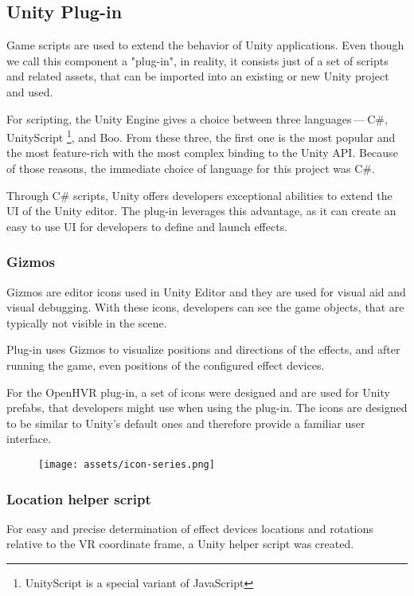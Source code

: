 \hypertarget{x-unity-plug-in}{\subsection*{Unity Plug-in}}
Game scripts are used to extend the behavior of Unity applications. Even though
we call this component a "plug-in", in reality, it consists just of a
set of scripts and related assets, that can be imported into an existing
or new Unity project and used.


For scripting, the Unity Engine gives a choice between three languages — C\#, UnityScript \footnote{UnityScript is a special variant of JavaScript}, and
Boo. From these three, the first one is the most popular and the most
feature-rich with the most complex binding to the Unity API. \hyperlink{unityblog}{}
Because of those reasons, the immediate choice of language for this
project was C\#.


Through C\# scripts, Unity offers developers exceptional abilities to extend
the UI of the Unity editor. The plug-in leverages this advantage, as it can
create an easy to use UI for developers to define and launch effects.


\hypertarget{x-gizmos}{\subsubsection*{Gizmos}}
Gizmos are editor icons used in Unity Editor and they are used for
visual aid and visual debugging. \hyperlink{gizmos}{}
With these icons, developers can see the game objects, that are
typically not visible in the scene.


Plug-in uses Gizmos to visualize positions and directions of the
effects, and after running the game, even positions of the configured
effect devices.


For the OpenHVR plug-in, a set of icons were designed and are used for
Unity prefabs, that developers might use when using the plug-in. The icons
are designed to be similar to Unity’s default ones and therefore provide
a familiar user interface.


\begin{figure}[h]{}
\centering\texttt{[image: assets/icon-series.png]}
\caption{}

\end{figure}

\hypertarget{x-location-helper-script}{\subsubsection*{Location helper script}}
For easy and precise determination of effect devices locations and rotations
relative to the VR coordinate frame, a Unity helper script was created.


